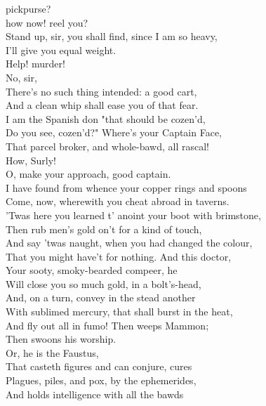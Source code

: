 \documentclass[a4paper,oneside]{memoir}
\begin{document}
\begin{drama*}
pickpurse?\\
how now! reel you?\\
Stand up, sir, you shall find, since I am so heavy,\\
I'll give you equal weight.\\
\subtlespeaks {} Help! murder!\\
\surlyspeaks {} No, sir,\\
There's no such thing intended: a good cart,\\
And a clean whip shall ease you of that fear.\\
I am the Spanish don "that should be cozen'd,\\
Do you see, cozen'd?" Where's your Captain Face,\\
That parcel broker, and whole-bawd, all rascal!\\
\facespeaks How, Surly!\\
\surlyspeaks {} O, make your approach, good captain.\\
I have found from whence your copper rings and spoons\\
Come, now, wherewith you cheat abroad in taverns.\\
'Twas here you learned t' anoint your boot with brimstone,\\
Then rub men's gold on't for a kind of touch,\\
And say 'twas naught, when you had changed the colour,\\
That you might have't for nothing. And this doctor,\\
Your sooty, smoky-bearded compeer, he\\
Will close you so much gold, in a bolt's-head,\\
And, on a turn, convey in the stead another\\
With sublimed mercury, that shall burst in the heat,\\
And fly out all in fumo! Then weeps Mammon;\\
Then swoons his worship.\\
Or, he is the Faustus,\\
That casteth figures and can conjure, cures\\
Plagues, piles, and pox, by the ephemerides,\\
And holds intelligence with all the bawds\\

\end{drama*}
\end{document}
